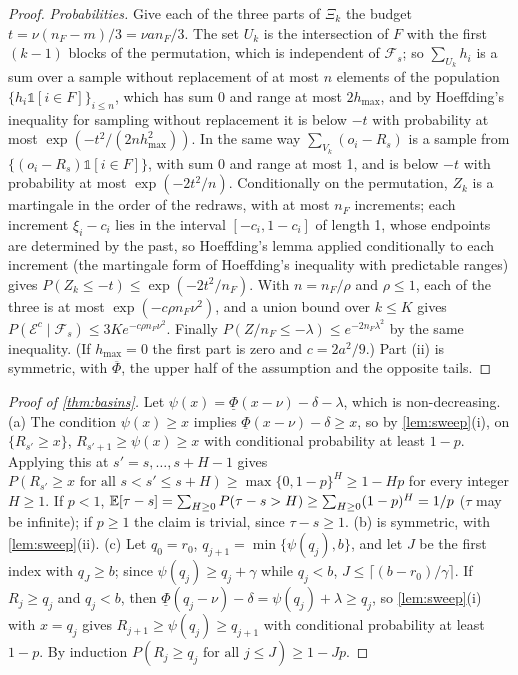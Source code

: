 \begin{proof}
\emph{Probabilities.} Give each of the three parts of $\Xi_k$ the budget $t=\nu(n_F-m)/3=\nu a n_F/3$. The set $U_k$ is the
intersection of $F$ with the first $(k-1)$ blocks of the permutation, which is independent of $\mathcal F_s$; so
$\sum_{U_k}h_i$ is a sum over a sample without replacement of at most $n$ elements of the population
$\{h_i\mathbb 1[i\in F]\}_{i\le n}$, which has sum 0 and range at most $2h_{\max}$, and by Hoeffding's inequality for
sampling without replacement \citep[Section~6]{hoeffding1963} it is below $-t$ with probability at most
$\exp(-t^2/(2nh_{\max}^2))$. In the same way $\sum_{V_k}(o_i-R_s)$ is a sample from $\{(o_i-R_s)\mathbb 1[i\in F]\}$, with
sum 0 and range at most 1, and is below $-t$ with probability at most $\exp(-2t^2/n)$. Conditionally on the permutation,
$Z_k$ is a martingale in the order of the redraws, with at most $n_F$ increments; each increment $\xi_i-c_i$ lies in
the interval $[-c_i,1-c_i]$ of length 1, whose endpoints are determined by the past, so Hoeffding's lemma applied
conditionally to each increment (the martingale form of Hoeffding's inequality with predictable ranges) gives
$P(Z_k\le-t)\le\exp(-2t^2/n_F)$. With $n=n_F/\rho$ and $\rho\le1$, each of the three
is at most $\exp(-c\rho n_F\nu^2)$, and a union bound over $k\le K$ gives $P(\mathcal E^c\mid\mathcal F_s)\le3Ke^{-c\rho n_F\nu^2}$.
Finally $P(Z/n_F\le-\lambda)\le e^{-2n_F\lambda^2}$ by the same inequality. (If $h_{\max}=0$ the first part is zero and
$c=2a^2/9$.) Part (ii) is symmetric, with $\overline\Phi$, the upper half of the assumption and the opposite tails.
\end{proof}

\begin{proof}[Proof of \cref{thm:basins}]
Let $\psi(x)=\underline\Phi(x-\nu)-\delta-\lambda$, which is non-decreasing.
(a) The condition $\psi(x)\ge x$ implies $\underline\Phi(x-\nu)-\delta\ge x$, so by \cref{lem:sweep}(i), on $\{R_{s'}\ge x\}$,
$R_{s'+1}\ge\psi(x)\ge x$ with conditional probability at least $1-p$. Applying this at $s'=s,\dots,s+H-1$ gives
$P(R_{s'}\ge x\text{ for all }s<s'\le s+H)\ge\max\{0,1-p\}^H\ge1-Hp$ for every integer $H\ge1$. If $p<1$,
$\mathbb{E}[\tau-s]=\sum_{H\ge0}P(\tau-s>H)\ge\sum_{H\ge0}(1-p)^H=1/p$ ($\tau$ may be infinite); if $p\ge1$ the claim is
trivial, since $\tau-s\ge1$.
(b) is symmetric, with \cref{lem:sweep}(ii).
(c) Let $q_0=r_0$, $q_{j+1}=\min\{\psi(q_j),b\}$, and let $J$ be the first index with $q_J\ge b$; since
$\psi(q_j)\ge q_j+\gamma$ while $q_j<b$, $J\le\lceil(b-r_0)/\gamma\rceil$. If $R_j\ge q_j$ and $q_j<b$, then
$\underline\Phi(q_j-\nu)-\delta=\psi(q_j)+\lambda\ge q_j$, so \cref{lem:sweep}(i) with $x=q_j$ gives
$R_{j+1}\ge\psi(q_j)\ge q_{j+1}$ with conditional probability at least $1-p$. By induction
$P(R_j\ge q_j\text{ for all }j\le J)\ge1-Jp$.
\end{proof}

